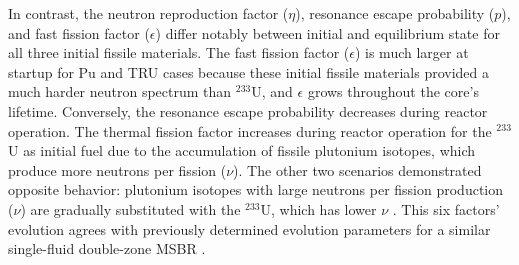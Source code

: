 In contrast, the neutron reproduction factor ($\eta$), resonance escape 
probability ($p$), and fast fission factor ($\epsilon$) differ notably between 
initial and equilibrium state for all three initial fissile materials. The 
fast fission factor ($\epsilon$) is much larger at startup for Pu and TRU 
cases because these initial fissile materials provided a much harder neutron 
spectrum than $^{233}$U, and $\epsilon$ grows throughout the core's lifetime. 
Conversely, the resonance escape probability decreases during reactor 
operation. The thermal fission factor increases during reactor operation for 
the $^{233}$U as initial fuel due to the accumulation of fissile plutonium 
isotopes, which produce more neutrons per fission ($\nu$). The other two 
scenarios demonstrated opposite behavior: plutonium isotopes with large 
neutrons per fission production ($\nu$) are gradually substituted with the 
$^{233}$U, which has lower $\nu$ \cite{sjostrand_cross_1960}. This six 
factors' evolution agrees with previously determined evolution parameters for 
a similar single-fluid double-zone \gls{MSBR} \cite{ashraf2019whole_core, 
rykhlevskii2019modeling, park_whole_2015}.